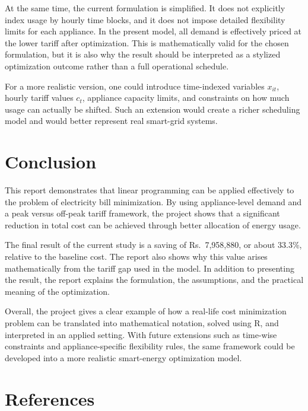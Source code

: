 \documentclass[12pt,a4paper]{article}
\newcommand{\datasetlink}{\href{https://www.kaggle.com/datasets/suraj520/indian-household-electricity-bill}}
\newcommand{\githublink}{\href{https://github.com/rangerbelx/Electricity-Bill-Minimization-Using-Linear-Optimization/}}
\begin{document}
At the same time, the current formulation is simplified. It does not explicitly index usage by hourly time blocks, and it does not impose detailed flexibility limits for each appliance. In the present model, all demand is effectively priced at the lower tariff after optimization. This is mathematically valid for the chosen formulation, but it is also why the result should be interpreted as a stylized optimization outcome rather than a full operational schedule.

For a more realistic version, one could introduce time-indexed variables \(x_{it}\), hourly tariff values \(c_t\), appliance capacity limits, and constraints on how much usage can actually be shifted. Such an extension would create a richer scheduling model and would better represent real smart-grid systems.

\section{Conclusion}

This report demonstrates that linear programming can be applied effectively to the problem of electricity bill minimization. By using appliance-level demand and a peak versus off-peak tariff framework, the project shows that a significant reduction in total cost can be achieved through better allocation of energy usage.

The final result of the current study is a saving of Rs.\ 7,958,880, or about 33.3\%, relative to the baseline cost. The report also shows why this value arises mathematically from the tariff gap used in the model. In addition to presenting the result, the report explains the formulation, the assumptions, and the practical meaning of the optimization.

Overall, the project gives a clear example of how a real-life cost minimization problem can be translated into mathematical notation, solved using R, and interpreted in an applied setting. With future extensions such as time-wise constraints and appliance-specific flexibility rules, the same framework could be developed into a more realistic smart-energy optimization model.

\section{References}

\end{document}
